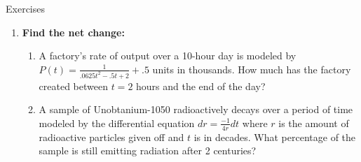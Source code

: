 \documentclass[../revisedmain.tex]{subfiles}
\begin{document}
\begin{center}
	\LARGE Exercises
\end{center}
\begin{enumerate}
	\item\textbf{Find the net change:}
	\begin{enumerate}
		\item A factory's rate of output over a 10-hour day is modeled by $P(t)=\displaystyle\frac{1}{.0625t^2-.5t+2}+.5$ units in thousands. How much has the factory created between $t=2$ hours and the end of the day?
		\item A sample of Unobtanium-1050 radioactively decays over a period of time modeled by the differential equation $dr=\displaystyle\frac{-1}{4r}dt$ where $r$ is the amount of radioactive particles given off and $t$ is in decades. What percentage of the sample is still emitting radiation after 2 centuries?
	\end{enumerate}
\end{enumerate}
\end{document}
